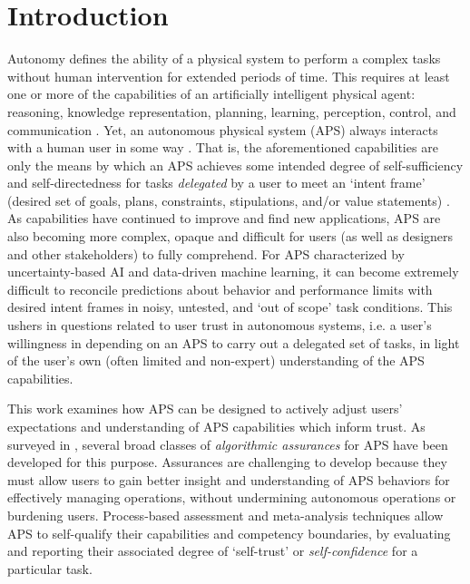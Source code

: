 \section{Introduction}
Autonomy defines the ability of a physical system to perform a complex tasks without human intervention for extended periods of time. This requires at least one or more of the capabilities of an artificially intelligent physical agent: reasoning, knowledge representation, planning, learning, perception, control, and communication \cite{Israelsen2017-ym}. 
Yet, an autonomous physical system (APS) always interacts with a human user in some way \cite{Bradshaw2013-ck}.  That is, the aforementioned capabilities are only the means by which an APS achieves some intended degree of self-sufficiency and self-directedness for tasks \emph{delegated} by a user to meet an `intent frame' (desired set of goals, plans, constraints, stipulations, and/or value statements) \cite{Miller2014-av}. 
As capabilities have continued to improve and find new applications, APS are also becoming more complex, opaque and difficult for users (as well as designers and other stakeholders) to fully comprehend. For APS characterized by uncertainty-based AI and data-driven machine learning, it can become extremely difficult to reconcile predictions about behavior and performance limits with desired intent frames in noisy, untested, and `out of scope' task conditions. This ushers in questions related to user trust in autonomous systems, i.e. a user's willingness in depending on an APS to carry out a delegated set of tasks, in light of the user's own (often limited and non-expert) understanding of the APS capabilities. 

This work examines how APS can be designed to actively adjust users' expectations and understanding of APS capabilities which inform trust. As surveyed in \cite{Israelsen2017-ym}, several broad classes of \emph{algorithmic assurances} for APS have been developed for this purpose. 
Assurances are challenging to develop because they must allow users to gain better insight and understanding of APS behaviors for effectively managing operations, without undermining autonomous operations or burdening users. 
Process-based assessment and meta-analysis techniques allow APS to self-qualify their capabilities and competency boundaries, by evaluating and reporting their associated degree of `self-trust' or \emph{self-confidence} for a particular task. 

